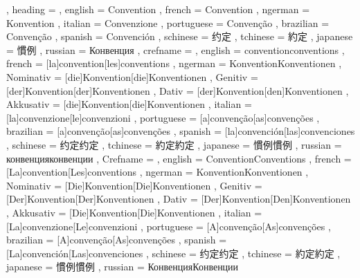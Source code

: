   {
    , heading =   {
                    , english     = Convention
                    , french      = Convention
                    , ngerman     = Konvention
                    , italian     = Convenzione
                    , portuguese  = Convenção
                    , brazilian   = Convenção
                    , spanish     = Convención
                    , schinese    = 约定
                    , tchinese    = 約定
                    , japanese    = 慣例
                    , russian     = Конвенция
                  }
    , crefname =  {
                    , english     = {convention}{conventions}
                    , french      = [la]{convention}[les]{conventions}
                    , ngerman     = { {Konvention}{Konventionen}
                                      , Nominativ = [die]{Konvention}[die]{Konventionen}
                                      , Genitiv   = [der]{Konvention}[der]{Konventionen}
                                      , Dativ     = [der]{Konvention}[den]{Konventionen}
                                      , Akkusativ = [die]{Konvention}[die]{Konventionen}
                                    }
                    , italian     = [la]{convenzione}[le]{convenzioni}
                    , portuguese  = [a]{convenção}[as]{convenções}
                    , brazilian   = [a]{convenção}[as]{convenções}
                    , spanish     = [la]{convención}[las]{convenciones}
                    , schinese    = {约定}{约定}
                    , tchinese    = {約定}{約定}
                    , japanese    = {慣例}{慣例}
                    , russian     = {конвенция}{конвенции}
                  }
    , Crefname =  {
                    , english     = {Convention}{Conventions}
                    , french      = [La]{convention}[Les]{conventions}
                    , ngerman     = { {Konvention}{Konventionen}
                                      , Nominativ = [Die]{Konvention}[Die]{Konventionen}
                                      , Genitiv   = [Der]{Konvention}[Der]{Konventionen}
                                      , Dativ     = [Der]{Konvention}[Den]{Konventionen}
                                      , Akkusativ = [Die]{Konvention}[Die]{Konventionen}
                                    }
                    , italian     = [La]{convenzione}[Le]{convenzioni}
                    , portuguese  = [A]{convenção}[As]{convenções}
                    , brazilian   = [A]{convenção}[As]{convenções}
                    , spanish     = [La]{convención}[Las]{convenciones}
                    , schinese    = {约定}{约定}
                    , tchinese    = {約定}{約定}
                    , japanese    = {慣例}{慣例}
                    , russian     = {Конвенция}{Конвенции}
                  }
  }

